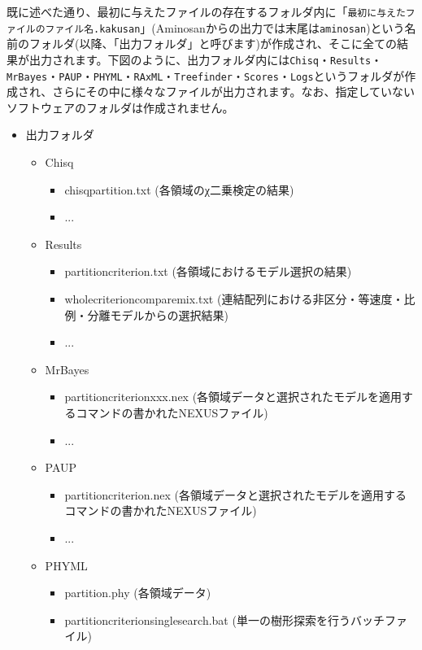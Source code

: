 \documentclass[titlepage,10pt,a4paper]{jsbook}
\begin{document}
既に述べた通り、最初に与えたファイルの存在するフォルダ内に「\texttt{最初に与えたファイルのファイル名.kakusan}」(Aminosanからの出力では末尾は\texttt{aminosan})という名前のフォルダ(以降、「出力フォルダ」と呼びます)が作成され、そこに全ての結果が出力されます。下図のように、出力フォルダ内には\texttt{Chisq}・\texttt{Results}・\texttt{MrBayes}・\texttt{PAUP}・\texttt{PHYML}・\texttt{RAxML}・\texttt{Treefinder}・\texttt{Scores}・\texttt{Logs}というフォルダが作成され、さらにその中に様々なファイルが出力されます。なお、指定していないソフトウェアのフォルダは作成されません。
\begin{itemize}\small\setlength{\baselineskip}{1.1em}
\item 出力フォルダ
\begin{itemize}
\item Chisq
\begin{itemize}
\item chisq{\textunderscore}partition.txt (各領域のχ二乗検定の結果)
\item ...
\end{itemize}
\item Results
\begin{itemize}
\item partition{\textunderscore}criterion.txt (各領域におけるモデル選択の結果)
\item whole{\textunderscore}criterion{\textunderscore}comparemix.txt (連結配列における非区分・等速度・比例・分離モデルからの選択結果)
\item ...
\end{itemize}
\item MrBayes
\begin{itemize}
\item partition{\textunderscore}criterion{\textunderscore}xxx.nex (各領域データと選択されたモデルを適用するコマンドの書かれたNEXUSファイル)
\item ...
\end{itemize}
\item PAUP
\begin{itemize}
\item partition{\textunderscore}criterion.nex (各領域データと選択されたモデルを適用するコマンドの書かれたNEXUSファイル)
\item ...
\end{itemize}
\item PHYML
\begin{itemize}
\item partition.phy (各領域データ)
\item partition{\textunderscore}criterion{\textunderscore}singlesearch.bat (単一の樹形探索を行うバッチファイル)

\end{itemize}
\end{itemize}
\end{itemize}
\end{document}
